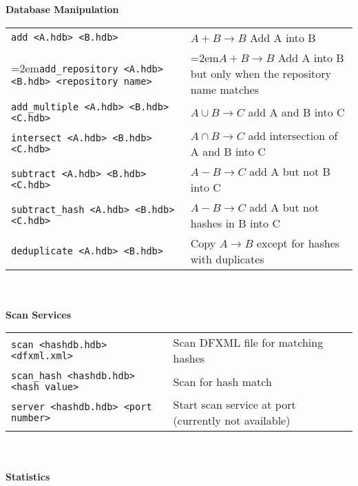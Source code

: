 \documentclass[12pt]{article}
\begin{document}
\textbf{Database Manipulation} \\
\begin{tabular}{p{3.6 in} p{3.4 in}}
\small\texttt{add <A.hdb> <B.hdb>} & $A + B \rightarrow B$ Add A into B \\
\hangindent=2em\small\texttt{add\_repository <A.hdb> <B.hdb> <repository name>} & \hangindent=2em$A + B \rightarrow B$ Add A into B but only when the repository name matches \\
\small\texttt{add\_multiple <A.hdb> <B.hdb> <C.hdb>} & $A \cup B \rightarrow C$ add A and B into C\\
\small\texttt{intersect <A.hdb> <B.hdb> <C.hdb>} & $A \cap B \rightarrow C$ add intersection of A and B into C\\
\small\texttt{subtract <A.hdb> <B.hdb> <C.hdb>} & $A - B \rightarrow C$ add A but not B into C\\
\small\texttt{subtract\_hash <A.hdb> <B.hdb> <C.hdb>} & $A - B \rightarrow C$ add A but not hashes in B into C\\
\small\texttt{deduplicate <A.hdb> <B.hdb>} & Copy $A \rightarrow B$ except for hashes with duplicates \\
\end{tabular}
\\
\\
\textbf{Scan Services} \\
\begin{tabular}{p{3.6 in} p{4 in}}
\small\texttt{scan <hashdb.hdb> <dfxml.xml>} & Scan DFXML file for matching hashes \\
\small\texttt{scan\_hash <hashdb.hdb> <hash value>} & Scan for hash match \\
\small\texttt{server <hashdb.hdb> <port number>} & Start scan service at port (currently not available)\\
\end{tabular}
\\
\\
\textbf{Statistics}\\
\end{document}
